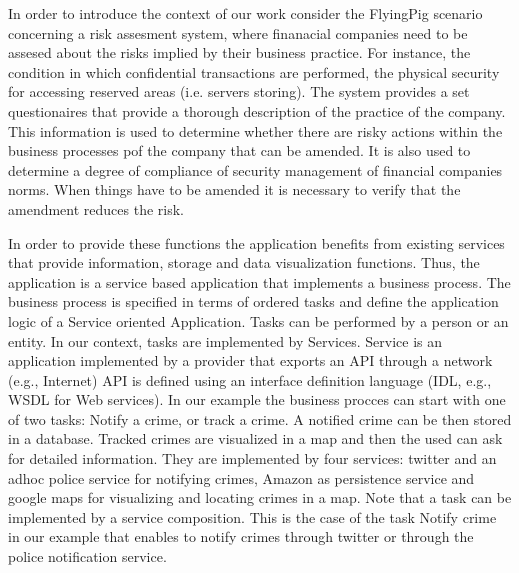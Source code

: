 
In order to introduce the context of our work consider the FlyingPig scenario concerning a risk assesment system, where finanacial companies need to be assesed about the risks implied by their business practice. For instance, the condition in which confidential transactions are performed, the physical security for accessing reserved areas (i.e. servers storing). The system provides a set questionaires that provide a thorough description of the practice of the company. This information is used to determine whether there are risky actions within the business processes pof the company that can be amended. It is also used to determine a degree of compliance of security management of financial companies norms. When things have to be amended it is necessary to verify that the amendment reduces the risk. 



 In order to provide these functions the application benefits from existing services that provide information,  storage and data visualization functions. Thus, the application is a service based application that implements a business process.
 The business process is specified in terms of ordered tasks and define the application logic of a Service oriented Application. Tasks can be performed by a person or an entity. In our context, tasks are implemented by Services. 
Service is an application implemented by a provider that exports an API through a network (e.g., Internet)
API is defined using an interface definition language (IDL, e.g., WSDL for Web services).
 In our example the business procces can start with one of two tasks: Notify a crime, or track a crime. A notified crime can be then stored in a database. Tracked crimes are visualized in a map and then the used can ask for detailed information. They are implemented by four services: twitter and an adhoc police service for notifying crimes, Amazon as persistence service and google maps for visualizing and locating crimes in a map. 
Note that a task can be implemented by a service composition. This is the case of the task Notify crime in our example that enables to notify crimes through twitter or through the police notification service. 
 

